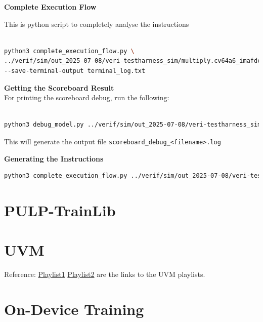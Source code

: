 \documentclass[12pt, a4paper]{article}
\begin{document}
\textbf{Complete Execution Flow}

This is python script to completely analyse the instructions

\begin{lstlisting}[language=bash, frame=single, basicstyle=\ttfamily, numbers=none]

python3 complete_execution_flow.py \
../verif/sim/out_2025-07-08/veri-testharness_sim/multiply.cv64a6_imafdc_sv39.log \
--save-terminal-output terminal_log.txt

\end{lstlisting}

\textbf{Getting the Scoreboard Result\\}
For printing the scoreboard debug, run the following:

\begin{lstlisting}[language=bash, frame=single, basicstyle=\ttfamily, numbers=none]

python3 debug_model.py ../verif/sim/out_2025-07-08/veri-testharness_sim/multiply.cv64a6_imafdc_sv39.log

\end{lstlisting}

This will generate the output file \texttt{scoreboard\_debug\_\textless filename\textgreater.log} 

\textbf{Generating the Instructions}
\begin{lstlisting}[language=bash, frame=single, basicstyle=\ttfamily, numbers=none]
python3 complete_execution_flow.py ../verif/sim/out_2025-07-08/veri-testharness_sim/multiply.cv64a6_imafdc_sv39.log --performance --save-terminal-output corrected_test.txt --colors
\end{lstlisting}

\section{PULP-TrainLib}

\section{UVM}
Reference: \href{https://youtube.com/playlist?list=PLuYB6t6povcLgoHWLJgk-VeMQ0Rscjw03&si=l-rjyvLkuttomYeC}{Playlist1}
\href{https://youtube.com/playlist?list=PLqPfWwayuBvNrr09dCweog1htCBLUbN4W&si=4vI1Fs_sgz-A0wXdC}{Playlist2} are the links to the UVM playlists.

\section{On-Device Training}
\end{document}
